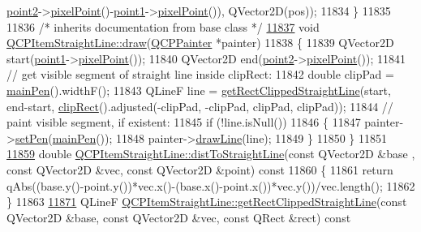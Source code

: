 \begin{DoxyCode}
      \hyperlink{a00040_ad26c0a732e471f63f75d481dcd48cfc9}{point2}->\hyperlink{a00038_ae490f9c76ee2ba33752c495d3b6e8fb5}{pixelPoint}()-\hyperlink{a00040_ac131a6ffe456f2cc7364dce541fe0120}{point1}->\hyperlink{a00038_ae490f9c76ee2ba33752c495d3b6e8fb5}{pixelPoint}()), QVector2D(pos));
11834 \}
11835 
11836 \textcolor{comment}{/* inherits documentation from base class */}
\hypertarget{a00115_source_l11837}{}\hyperlink{a00040_a2daa1e1253216c26565d56a2d5530170}{11837} \textcolor{keywordtype}{void} \hyperlink{a00040_a2daa1e1253216c26565d56a2d5530170}{QCPItemStraightLine::draw}(\hyperlink{a00047}{QCPPainter} *painter)
11838 \{
11839   QVector2D start(\hyperlink{a00040_ac131a6ffe456f2cc7364dce541fe0120}{point1}->\hyperlink{a00038_ae490f9c76ee2ba33752c495d3b6e8fb5}{pixelPoint}());
11840   QVector2D end(\hyperlink{a00040_ad26c0a732e471f63f75d481dcd48cfc9}{point2}->\hyperlink{a00038_ae490f9c76ee2ba33752c495d3b6e8fb5}{pixelPoint}());
11841   \textcolor{comment}{// get visible segment of straight line inside clipRect:}
11842   \textcolor{keywordtype}{double} clipPad = \hyperlink{a00040_a63ef39814c5b560dbb7b13e3fec1d940}{mainPen}().widthF();
11843   QLineF line = \hyperlink{a00040_af18ac29577b5b96fece15b0ffea70177}{getRectClippedStraightLine}(start, end-start, 
      \hyperlink{a00022_a538e25ff8856534582f5b2b400a46405}{clipRect}().adjusted(-clipPad, -clipPad, clipPad, clipPad));
11844   \textcolor{comment}{// paint visible segment, if existent:}
11845   \textcolor{keywordflow}{if} (!line.isNull())
11846   \{
11847     painter->\hyperlink{a00047_af9c7a4cd1791403901f8c5b82a150195}{setPen}(\hyperlink{a00040_a63ef39814c5b560dbb7b13e3fec1d940}{mainPen}());
11848     painter->\hyperlink{a00047_a0b4b1b9bd495e182c731774dc800e6e0}{drawLine}(line);
11849   \}
11850 \}
11851 
\hypertarget{a00115_source_l11859}{}\hyperlink{a00040_adc9b6c5bd33c7f806b748b79dfa25926}{11859} \textcolor{keywordtype}{double} \hyperlink{a00040_adc9b6c5bd33c7f806b748b79dfa25926}{QCPItemStraightLine::distToStraightLine}(\textcolor{keyword}{const} QVector2D &base
      , \textcolor{keyword}{const} QVector2D &vec, \textcolor{keyword}{const} QVector2D &point)\textcolor{keyword}{ const}
11860 \textcolor{keyword}{}\{
11861   \textcolor{keywordflow}{return} qAbs((base.y()-point.y())*vec.x()-(base.x()-point.x())*vec.y())/vec.length();
11862 \}
11863 
\hypertarget{a00115_source_l11871}{}\hyperlink{a00040_af18ac29577b5b96fece15b0ffea70177}{11871} QLineF \hyperlink{a00040_af18ac29577b5b96fece15b0ffea70177}{QCPItemStraightLine::getRectClippedStraightLine}(\textcolor{keyword}{const}
       QVector2D &base, \textcolor{keyword}{const} QVector2D &vec, \textcolor{keyword}{const} QRect &rect)\textcolor{keyword}{ const}

\end{DoxyCode}
